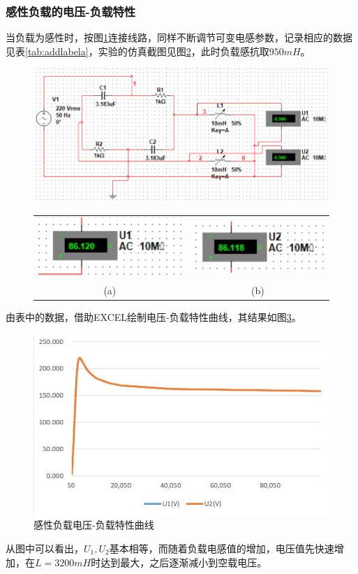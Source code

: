 \documentclass[12pt]{article}%
\begin{document}
\subsubsection{感性负载的电压-负载特性}
当负载为感性时，按图\ref{fig:a12a}连接线路，同样不断调节可变电感参数，记录相应的数据见表\ref{tab:addlabela}，实验的仿真截图见图\ref{fig:x11a}，此时负载感抗取$950mH$。
\begin{figure}[htbp]
\centering\includegraphics[width=\linewidth]{TIM20180601152857.png}
\caption{\heiti{}}\label{fig:a12a}
\end{figure}
\begin{figure}[htbp]
\centering
\begin{tabular}{cc}
\includegraphics[width=0.4\linewidth]{TIM20180607120314.png}&
\includegraphics[width=0.4\linewidth]{TIM20180607120357.png}\\
(a)&(b)\\
\end{tabular}
\caption{\heiti{}}\label{fig:x11a}
\end{figure}

由表中的数据，借助EXCEL绘制电压-负载特性曲线，其结果如图\ref{fig:a121x}。\par
\begin{figure}[htbp]
\centering\includegraphics[width=0.8\linewidth]{TIM20180531195752.png}
\caption{\heiti{}感性负载电压-负载特性曲线}\label{fig:a121x}
\end{figure}
从图中可以看出，$U_1,U_2$基本相等，而随着负载电感值的增加，电压值先快速增加，在$L=3200mH$时达到最大，之后逐渐减小到空载电压。
\end{document}
